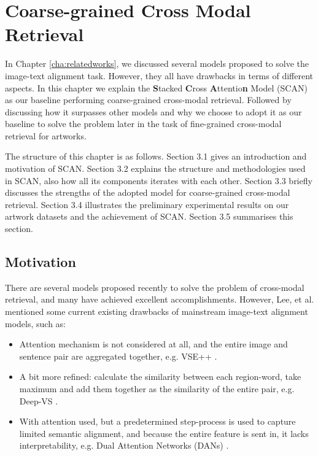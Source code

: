 \chapter{Coarse-grained Cross Modal Retrieval}
\label{cha:scan}
In Chapter \ref{cha:relatedworks}, we discussed several models proposed to solve the image-text alignment task. However, they all have drawbacks in terms of different aspects. In this chapter we explain the \textbf{S}tacked \textbf{C}ross \textbf{A}ttentio\textbf{n} Model (SCAN) \cite{scan} as our baseline performing coarse-grained cross-modal retrieval. Followed by discussing how it surpasses other models and why we choose to adopt it as our baseline to solve the problem later in the task of fine-grained cross-modal retrieval for artworks.

The structure of this chapter is as follows. Section 3.1 gives an introduction and motivation of SCAN. Section 3.2 explains the structure and methodologies used in SCAN, also how all its components iterates with each other. Section 3.3 briefly discusses the strengths of the adopted model for coarse-grained cross-modal retrieval. Section 3.4 illustrates the preliminary experimental results on our artwork datasets and the achievement of SCAN. Section 3.5 summarises this section.

\section{Motivation}

There are several models proposed recently to solve the problem of cross-modal retrieval, and many have achieved excellent accomplishments. However, Lee, et al. \cite{scan} mentioned some current existing drawbacks of mainstream image-text alignment models, such as:

\begin{itemize}
    \item Attention mechanism is not considered at all, and the entire image and sentence pair are aggregated together, e.g. VSE++ \cite{vse}.
    \item A bit more refined: calculate the similarity between each region-word, take maximum and add them together as the similarity of the entire pair, e.g. Deep-VS \cite{neuraltalk2}.
    \item With attention used, but a predetermined step-process is used to capture limited semantic alignment, and because the entire feature is sent in, it lacks interpretability, e.g. Dual Attention Networks (DANs) \cite{dan}.
\end{itemize}

